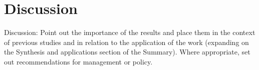 
\section{Discussion}

Discussion: Point out the importance of the results and place them in the context of previous studies and in relation to the application of the work (expanding on the Synthesis and applications section of the Summary). Where appropriate, set out recommendations for management or policy.